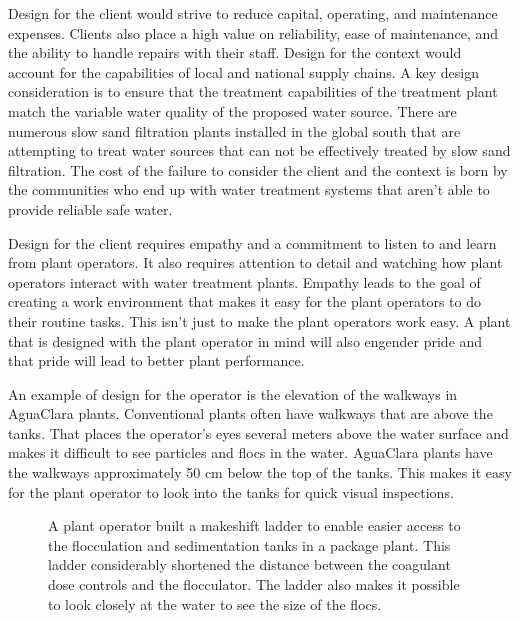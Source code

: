 \documentclass[letterpaper,10pt,english]{sphinxmanual}
\let\sphinxpxdimen\pdfpxdimen\else\newdimen\sphinxpxdimen
\begin{document}
Design for the client would strive to reduce capital, operating, and maintenance expenses. Clients also place a high value on reliability, ease of maintenance, and the ability to handle repairs with their staff. Design for the context would account for the capabilities of local and national supply chains. A key design consideration is to ensure that the treatment capabilities of the treatment plant match the variable water quality of the proposed water source. There are numerous slow sand filtration plants installed in the global south that are attempting to treat water sources that can not be effectively treated by slow sand filtration. The cost of the failure to consider the client and the context is born by the communities who end up with water treatment systems that aren’t able to provide reliable safe water.

Design for the client requires empathy and a commitment to listen to and learn from plant operators. It also requires attention to detail and watching how plant operators interact with water treatment plants. Empathy leads to the goal of creating a work environment that makes it easy for the plant operators to do their routine tasks. This isn’t just to make the plant operators work easy. A plant that is designed with the plant operator in mind will also engender pride and that pride will lead to better plant performance.

An example of design for the operator is the elevation of the walkways in AguaClara plants. Conventional plants often have walkways that are above the tanks. That places the operator’s eyes several meters above the water surface and makes it difficult to see particles and flocs in the water. AguaClara plants have the walkways approximately 50 cm below the top of the tanks. This makes it easy for the plant operator to look into the tanks for quick visual inspections.

\begin{figure}[htbp]
\centering
\capstart

\noindent\sphinxincludegraphics[width=300\sphinxpxdimen]{{Improvised_ladder_access_to_sed_tank}.jpg}
\caption{A plant operator built a makeshift ladder to enable easier access to the flocculation and sedimentation tanks in a package plant. This ladder considerably shortened the distance between the coagulant dose controls and the flocculator. The ladder also makes it possible to look closely at the water to see the size of the flocs.}\label{\detokenize{Introduction/Introduction:id22}}\label{\detokenize{Introduction/Introduction:figure}}\end{figure}
\end{document}
